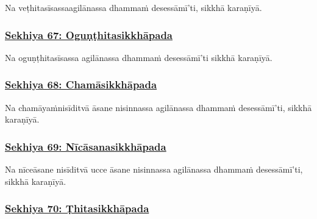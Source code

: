Na veṭhitasīsassa\makeatletter\hyperlink{endnote517-appendix}\makeatother \thinspace agilānassa dhammaṁ desessāmī'ti, sikkhā karaṇīyā.



\subsubsection*{\hyperref[training67]{Sekhiya 67: Oguṇṭhitasikkhāpada}}
\label{sekh67}

Na oguṇṭhitasīsassa agilānassa dhammaṁ desessāmī'ti sikkhā karaṇīyā.



\subsubsection*{\hyperref[training68]{Sekhiya 68: Chamāsikkhāpada}}
\label{sekh68}

Na chamāyaṁ\makeatletter\hyperlink{endnote518-appendix}\makeatother \thinspace nisīditvā āsane nisinnassa agilānassa dhammaṁ desessāmī'ti, sikkhā karaṇīyā.



\subsubsection*{\hyperref[training69]{Sekhiya 69: Nīcāsanasikkhāpada}}
\label{sekh69}

Na nīce\makeatletter\hyperlink{endnote519-appendix}\makeatother \thinspace āsane nisīditvā ucce āsane nisinnassa agilānassa dhammaṁ desessāmī'ti, sikkhā karaṇīyā.



\subsubsection*{\hyperref[training70]{Sekhiya 70: Ṭhitasikkhāpada}}
\label{sekh70}

